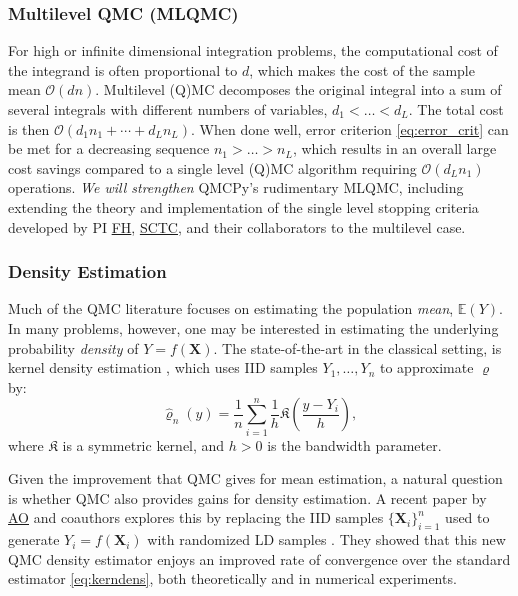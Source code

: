 \documentclass[11pt]{NSFamsart}
\newcommand{\FH}{\hyperlink{FHlink}{FH}\xspace}
\newcommand{\SCTC}{\hyperlink{SCTClink}{SCTC}\xspace}
\newcommand{\AO}{\hyperlink{AOlink}{AO}\xspace}
\newcommand{\bX}{{\boldsymbol{X}}}
\newcommand{\fK}{{\mathfrak{K}}}
\newcommand{\Order}{\mathcal{O}}
\begin{document}
\subsubsection{Multilevel QMC (MLQMC)}
For high or infinite dimensional integration problems, the computational cost of the integrand is often proportional to $d$, which makes the cost of the sample mean $\Order(dn)$.  Multilevel (Q)MC \cite{Gil15a} decomposes the original integral into a sum of several integrals with different numbers of variables, $d_1 < \dots < d_L$.  The total cost is then $\Order(d_1 n_1 + \cdots + d_L n_L)$. When done well, error criterion \eqref{eq:error_crit} can be met for a decreasing sequence $n_1 > \dots > n_L$, which results in an overall large cost savings compared to a single level (Q)MC algorithm requiring $\Order(d_Ln_1)$ operations. \emph{We will strengthen} QMCPy's rudimentary MLQMC, including extending the theory and implementation of the single level stopping criteria developed by PI \FH, \SCTC, and their collaborators \cite{HicEtal14a,HicJim16a,JimHic16a,HicEtal17a,RatHic19a} to the multilevel case.

\subsubsection{Density Estimation}

Much of the QMC  literature focuses on estimating the population \textit{mean}, $\mathbb{E}(Y)$. In many problems, however, one may be interested in estimating the underlying probability \textit{density} of $Y = f(\bX)$. The state-of-the-art in the classical setting, is kernel density estimation \cite{silverman1986density}, which uses IID samples $Y_1, \dots, Y_n$ to approximate $\varrho$ by:
\begin{equation}\label{eq:kerndens}
\hat{\varrho}_n(y) = \frac{1}{n} \sum_{i=1}^n \frac{1}{h} \fK \left( \frac{y - Y_i}{h} \right),
\end{equation}
where $\fK$ is a symmetric kernel, and $h>0$ is the bandwidth parameter.

Given the improvement that QMC gives for mean estimation, a natural question is whether QMC also provides gains for density estimation. A recent paper \cite{abdellah2018density} by \AO and coauthors explores this by replacing the IID samples $\{\bX_i\}_{i=1}^n$ used to generate $Y_i = f(\bX_i)$ with randomized LD samples \cite{owen2000monte}. They showed that this new QMC density estimator enjoys an improved rate of convergence over the standard estimator \eqref{eq:kerndens}, both theoretically and in numerical experiments.
\end{document}
